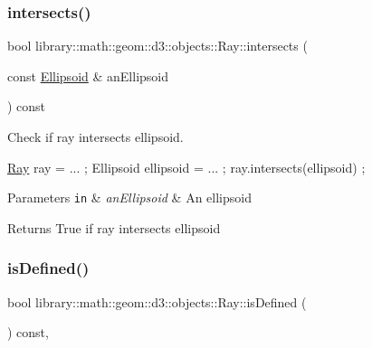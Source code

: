 \subsubsection{\texorpdfstring{intersects()}{intersects()}\hspace{0.1cm}{\footnotesize\ttfamily [2/2]}}
{\footnotesize\ttfamily bool library\+::math\+::geom\+::d3\+::objects\+::\+Ray\+::intersects (\begin{DoxyParamCaption}\item[{const \hyperlink{classlibrary_1_1math_1_1geom_1_1d3_1_1objects_1_1_ellipsoid}{Ellipsoid} \&}]{an\+Ellipsoid }\end{DoxyParamCaption}) const}



Check if ray intersects ellipsoid. 


\begin{DoxyCode}
\hyperlink{classlibrary_1_1math_1_1geom_1_1d3_1_1objects_1_1_ray_a11b7613464daaebc6e25a758b057f203}{Ray} ray = ... ;
Ellipsoid ellipsoid = ... ;
ray.intersects(ellipsoid) ;
\end{DoxyCode}



\begin{DoxyParams}[1]{Parameters}
\mbox{\tt in}  & {\em an\+Ellipsoid} & An ellipsoid \\
\hline
\end{DoxyParams}
\begin{DoxyReturn}{Returns}
True if ray intersects ellipsoid 
\end{DoxyReturn}
\mbox{\label{classlibrary_1_1math_1_1geom_1_1d3_1_1objects_1_1_ray_a7329f77a549a02e9c27d07c11adcc8bf}} 
\subsubsection{\texorpdfstring{is\+Defined()}{isDefined()}}
{\footnotesize\ttfamily bool library\+::math\+::geom\+::d3\+::objects\+::\+Ray\+::is\+Defined (\begin{DoxyParamCaption}{ }\end{DoxyParamCaption}) const\hspace{0.3cm}{\ttfamily [override]}, {\ttfamily [virtual]}}



